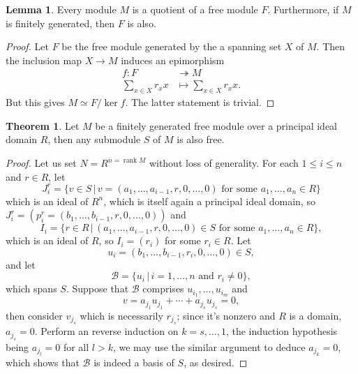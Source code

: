 \documentclass[10pt]{report}
\theoremstyle{definition}
\newtheorem{theorem}{Theorem}
\newtheorem{lemma}{Lemma}
\begin{document}
\begin{lemma}\label{lemma:quotiet_free}
Every module $M$ is a quotient of a free module $F$. Furthermore, if $M$ is finitely generated, then $F$ is also.
\end{lemma}
\begin{proof}
Let $F$ be the free module generated by the a spanning set $X$ of $M$. Then the inclusion map $X\to M$ induces an epimorphism
\begin{align*}
f:F&\twoheadrightarrow M\\
\sum_{x\in X}r_xx&\mapsto\sum_{x\in X}r_xx.
\end{align*}
But this gives $M\simeq F/\ker f$.
The latter statement is trivial.
\end{proof}

\begin{theorem}\label{submodule_free}
Let $M$ be a finitely generated free module over a principal ideal domain $R$, then any submodule $S$ of $M$ is also free.
\end{theorem}
\begin{proof}
Let us set $N=R^{n=\operatorname{rank}M}$ without loss of generality. For each $1\leq i\leq n$ and $r\in R$, let $$J^r_i=\{v\in S\,\big|\,v=(a_1,\dots,a_{i-1},r,0,\dots,0)\text{ for some }a_1,\dots,a_n\in R\}$$ which is an ideal of $R^n$, which is itself again a principal ideal domain, so $J^r_i=(p^r_i=(b_1,\dots,b_{i-1},r,0,\dots,0))$ and
$$I_i=\{r\in R\,\big|\,(a_1,\dots,a_{i-1},r,0,\dots,0)\in S\text{ for some }a_1,\dots,a_n\in R\},$$
which is an ideal of $R$, so $I_i=(r_i)$ for some $r_i\in R$.
Let $$u_i=(b_1,\dots,b_{i-1},r_i,0,\dots,0)\in S,$$ and let $$\mathcal{B}=\{u_i\,\big|\,i=1,\dots,n\text{ and }r_i\neq0\},$$ which spans $S$.
Suppose that $\mathcal{B}$ comprises $u_{i_1},\dots,u_{i_m}$ and $$v=a_{j_1}u_{j_1}+\cdots+a_{j_s}u_{j_s}=0,$$ then consider $v_{j_s}$ which is necessarily $r_{j_s}$; since it's nonzero and $R$ is a domain, $a_{j_s}=0$. Perform an reverse induction on $k=s,\dots,1$, the induction hypothesis being $a_{j_l}=0$ for all $l>k$, we may use the similar argument to deduce $a_{j_k}=0$, which shows that $\mathcal{B}$ is indeed a basis of $S$, as desired.
\end{proof}
\end{document}
